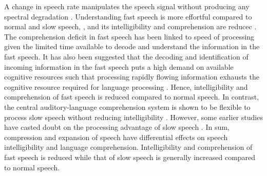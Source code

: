 \documentclass[a4paper, nobind]{templates/ociamthesis}
\begin{document}
A change in speech rate manipulates the speech signal without producing any spectral degradation \autocite{Charpentier1986,Moulines1990,Schlueter2014}.
Understanding fast speech is more effortful compared to normal and slow speech, \autocites[e.g.,][]{Mueller2019,Winn2021b}[see also,][]{Simantiraki2020}, and its intelligibility and comprehension are reducec \autocite{Fairbanks1957,Peelle2005,Schlueter2014}.
The comprehension deficit in fast speech has been linked to speed of processing \autocites{Gordonsalant1995,Tun1998}[see also,][]{Roennberg2013} given the limited time available to decode and understand the information in the fast speech.
It has also been suggested that the decoding and identification of incoming information in the fast speech puts a high demand on available cognitive resources \autocite[e.g.,][]{Rodero2016} such that processing rapidly flowing information exhausts the cognitive resource required for language processing \autocite{Gordonsalant2004,Janse2009}.
Hence, intelligibility and comprehension of fast speech is reduced compared to normal speech.
In contrast, the central auditory-language comprehension system is shown to be flexible to process slow speech without reducing intelligibility \autocites{Lerner2014a}[see also,][]{Vagharchakian2012}.
However, some earlier studies have casted doubt on the processing advantage of slow speech \autocites[e.g.,][]{Nejime1998,Kemper1999}[see also,][]{Liu2006,Love2009}.
In sum, compression and expansion of speech have differential effects on speech intelligibility and language comprehension.
Intelligibility and comprehension of fast speech is reduced while that of slow speech is generally increased compared to normal speech.
\end{document}
